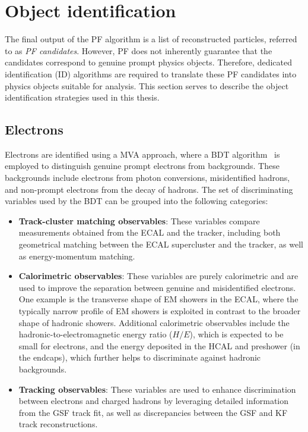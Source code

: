 \section{Object identification}
\label{Section:Chapter4_Object_Identification}

The final output of the \ac{PF} algorithm is a list of reconstructed particles, referred to as \textit{\ac{PF} candidates}. However, \ac{PF} does not inherently guarantee that the candidates correspond to genuine prompt physics objects. Therefore, dedicated identification (ID) algorithms are required to translate these \ac{PF} candidates into physics objects suitable for analysis. This section serves to describe the object identification strategies used in this thesis.

\subsection{Electrons}
\label{Section:Electron_Identification}

Electrons are identified using a \ac{MVA} approach, where a \ac{BDT} algorithm~\cite{Electron_ID} is employed to distinguish genuine prompt electrons from backgrounds. These backgrounds include electrons from photon conversions, misidentified hadrons, and non-prompt electrons from the decay of hadrons. The set of discriminating variables used by the \ac{BDT} can be grouped into the following categories:

\begin{itemize}
    \item \textbf{Track-cluster matching observables}: These variables compare measurements obtained from the \ac{ECAL} and the tracker, including both geometrical matching between the \ac{ECAL} supercluster and the tracker, as well as energy-momentum matching.
    \item \textbf{Calorimetric observables}: These variables are purely calorimetric and are used to improve the separation between genuine and misidentified electrons. One example is the transverse shape of EM showers in the \ac{ECAL}, where the typically narrow profile of EM showers is exploited in contrast to the broader shape of hadronic showers. Additional calorimetric observables include the hadronic-to-electromagnetic energy ratio ($H/E$), which is expected to be small for electrons, and the energy deposited in the \ac{HCAL} and preshower (in the endcaps), which further helps to discriminate against hadronic backgrounds.
    \item \textbf{Tracking observables}: These variables are used to enhance discrimination between electrons and charged hadrons by leveraging detailed information from the \ac{GSF} track fit, as well as discrepancies between the \ac{GSF} and \ac{KF} track reconstructions.
\end{itemize}

